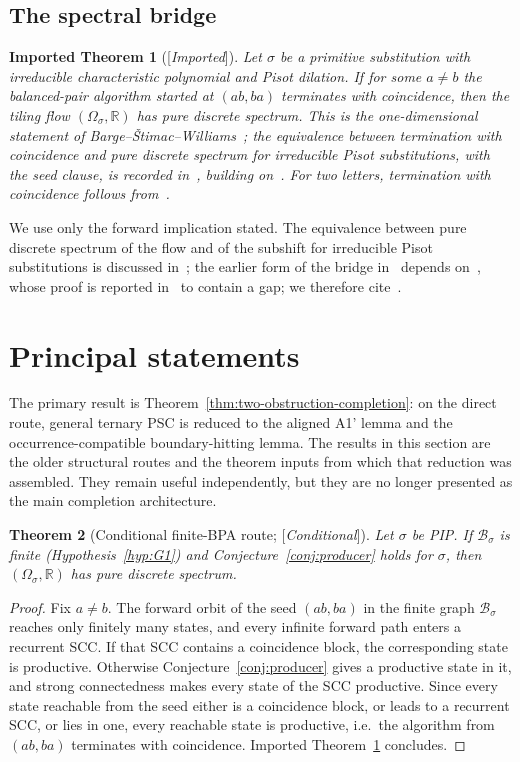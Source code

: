 \documentclass[11pt]{amsart}
\theoremstyle{plain}
\newtheorem{theorem}{Theorem}[section]
\newtheorem{importedtheorem}[theorem]{Imported Theorem}
\theoremstyle{definition}
\theoremstyle{remark}
\newcommand{\R}{\mathbb{R}}
\newcommand{\B}{\mathcal{B}}
\newcommand{\PDS}{pure discrete spectrum}
\newcommand{\Status}[1]{\textup{[\textit{#1}]}}
\begin{document}
\subsection{The spectral bridge}\label{sec:bridge}

\begin{importedtheorem}[\Status{Imported}]\label{thm:bridge}
Let $\sigma$ be a primitive substitution with irreducible characteristic polynomial and Pisot dilation. If for some $a\ne b$ the balanced-pair algorithm started at $(ab,ba)$ terminates with coincidence, then the tiling flow $(\Omega_\sigma,\R)$ has \PDS{}. This is the one-dimensional statement of Barge--\v{S}timac--Williams~\cite[Cor.~2]{BSW}; the equivalence between termination with coincidence and \PDS{} for irreducible Pisot substitutions, with the seed clause, is recorded in~\cite[Thm.~5.3]{ABBLS}, building on~\cite{SS,HS}. For two letters, termination with coincidence follows from~\cite{BD,HS}.
\end{importedtheorem}

We use only the forward implication stated. The equivalence between \PDS{} of the flow and of the subshift for irreducible Pisot substitutions is discussed in~\cite{CS,ABBLS}; the earlier form of the bridge in~\cite[Prop.~17.4]{BK} depends on~\cite[Thm.~16.3]{BK}, whose proof is reported in~\cite[\S1]{BSW} to contain a gap; we therefore cite~\cite{BSW}.

\section{Principal statements}\label{sec:principal}

The primary result is Theorem~\ref{thm:two-obstruction-completion}: on the
direct route, general ternary PSC is reduced to the aligned A1' lemma and the
occurrence-compatible boundary-hitting lemma.  The results in this section are
the older structural routes and the theorem inputs from which that reduction
was assembled.  They remain useful independently, but they are no longer
presented as the main completion architecture.

\begin{theorem}[Conditional finite-BPA route; \Status{Conditional}]\label{thm:main-conditional}
Let $\sigma$ be PIP. If $\B_\sigma$ is finite (Hypothesis~\ref{hyp:G1}) and Conjecture~\ref{conj:producer} holds for $\sigma$, then $(\Omega_\sigma,\R)$ has \PDS{}.
\end{theorem}
\begin{proof}
Fix $a\ne b$. The forward orbit of the seed $(ab,ba)$ in the finite graph $\B_\sigma$ reaches only finitely many states, and every infinite forward path enters a recurrent SCC. If that SCC contains a coincidence block, the corresponding state is productive. Otherwise Conjecture~\ref{conj:producer} gives a productive state in it, and strong connectedness makes every state of the SCC productive. Since every state reachable from the seed either is a coincidence block, or leads to a recurrent SCC, or lies in one, every reachable state is productive, i.e.\ the algorithm from $(ab,ba)$ terminates with coincidence. Imported Theorem~\ref{thm:bridge} concludes.
\end{proof}
\end{document}
